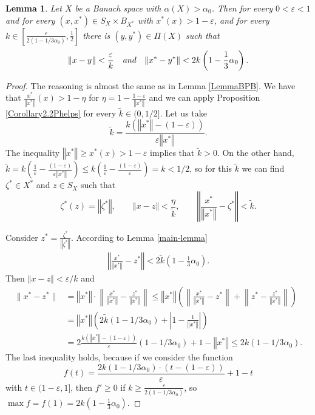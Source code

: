\documentclass[11pt,a4paper]{amsart}
\newcommand{\eps}{\varepsilon}
\newcommand{\norm}[1]{\left\Vert#1\right\Vert}
\numberwithin{equation}{section}
\theoremstyle{plain}
\newtheorem{lemma}[theorem]{Lemma}
\theoremstyle{definition}
\renewcommand{\leq}{\leqslant}
\renewcommand{\geq}{\geqslant}
\renewcommand{\le}{\leqslant}
\renewcommand{\ge}{\geqslant}
\begin{document}
\begin{lemma}\label{main_non-sq_lemma}
Let $X$ be a Banach space with $\alpha(X)> \alpha_0$. Then for every $0<\eps<1$ and for every $(x,x^*)\in S_X\times B_{X^*}$ with $x^*(x)> 1-\eps$, and for every $ k \in [\frac{\eps}{2(1-1/3\alpha_0)}, \frac12]$ there is $(y,y^*)\in \Pi(X)$ such that
\begin{align*}
\|x-y\|<\frac{\eps}{k}\quad \emph{and} \quad
\|x^*-y^*\|< 2k\left(1- \frac{1}{3}\alpha_0\right).
\end{align*}
\end{lemma}
\begin{proof}
The  reasoning is almost  the same as in Lemma \ref{LemmaBPB}. 
We have that $\frac{x^*}{\norm{x^*}}(x)> 1-\eta$ for $\eta=1-\frac{1-\eps}{\norm{x^*}}$ and we can apply Proposition \ref{Corollary2.2Phelps} for every $\tilde{k}\in (0,1/2]$. Let us take 
$$\tilde{k}=\frac{ k (\norm{x^*} - (1-\eps))}{\eps \norm{x^*}}.$$
The inequality $\norm{x^*} \ge x^*(x) > 1-\eps$ implies that $\tilde{k} > 0$. On the other hand, $\tilde{k}=k\left(\frac{1}{\eps} - \frac{(1-\eps)}{\eps  \norm{x^*}}\right)\le k\left(\frac{1}{\eps} - \frac{(1-\eps)}{\eps}\right) = k < 1/2$, so for this $\tilde{k}$ we can find  $\zeta^*\in X^*$ and $z\in S_X$  such that 
\begin{equation*} 
 \zeta^*(z) = \norm{\zeta^*},\qquad \norm{x-z} < \frac{\eta}{\tilde{k}}, \qquad \norm{\frac{x^*}{\norm{x^*}}-\zeta^*} <  \tilde{k}.
\end{equation*}

Consider $z^*=\frac{\zeta^*}{\norm{\zeta^*}}$. According to Lemma \ref{main-lemma} 
\begin{align*}
\norm{\frac{x^*}{\norm{x^*}}-z^*} <  2\tilde{k}\left(1- \frac{1}{3}\alpha_0\right).
\end{align*}
Then $\norm{x-z} < \eps/k$ and
\begin{align*}
\|x^*-z^*\|&=\norm{x^*}\cdot\left\|\frac{x^*}{\norm{x^*}}-\frac{z^*}{\norm{x^*}}\right\| \leq \norm{x^*}\left(\left\|\frac{x^*}{\norm{x^*}}-z^*\right\|+\left\|z^* - \frac{z^*}{\norm{x^*}}  \right\|\right)\\ 
&=\norm{x^*}\left( 2\tilde{k}(1- 1/3\alpha_0)+\left|1-\frac{1}{\norm{x^*}}\right|\right) \\
&=2\frac{k(\norm{x^*}-(1-\eps))}{\eps}(1- 1/3\alpha_0)+1-\norm{x^*} \leq 2k(1- 1/3\alpha_0).
\end{align*}
The last inequality holds, because if we consider the function $$f(t)=\frac{2k(1- 1/3\alpha_0)\cdot (t-(1-\eps))}{\eps}+1 - t$$ with $t\in (1-\eps, 1]$, then ${f'}\geq 0$ if $k\geq \frac{\eps}{2(1- 1/3\alpha_0)}$, so $\max f = f(1)=2k\left(1- \frac{1}{3}\alpha_0\right)$.
\end{proof}
\end{document}
